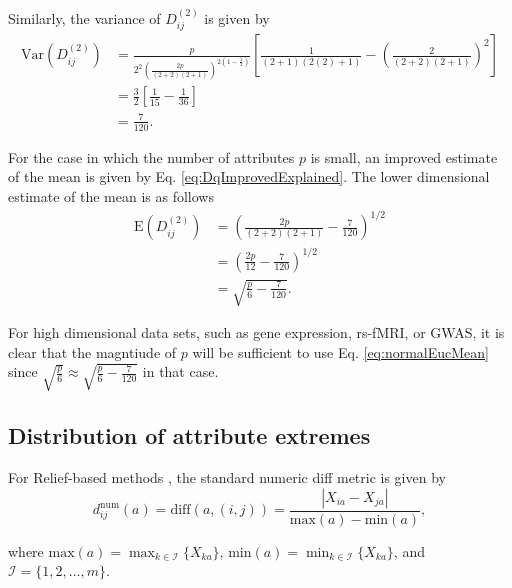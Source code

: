 \documentclass[10pt,letterpaper]{article}\usepackage[]{graphicx}\usepackage[]{color}
\begin{document}
Similarly, the variance of $D^{(2)}_{ij}$ is given by
%
\begin{equation}\label{eq:uniformEucVar}
\begin{aligned}
\text{Var}\left(D^{(2)}_{ij}\right) &= \frac{p}{2^2\left(\frac{2p}{(2 + 2)(2 + 1)}\right)^{2\left(1 - \frac{1}{2}\right)}}\left[\frac{1}{(2 + 1)(2(2) + 1)} - \left(\frac{2}{(2 + 2)(2 + 1)}\right)^2\right] \\
&= \frac{3}{2}\left[\frac{1}{15} - \frac{1}{36}\right] \\
&= \frac{7}{120}.
\end{aligned}
\end{equation}

For the case in which the number of attributes $p$ is small, an improved estimate of the mean is given by Eq. \ref{eq:DqImprovedExplained}. The lower dimensional estimate of the mean is as follows
%
\begin{equation}\label{eq:uniformEucMeanImproved}
\begin{aligned}
\text{E}\left(D^{(2)}_{ij}\right) &= \left(\frac{2p}{(2+2)(2+1)} - \frac{7}{120}\right)^{1/2} \\
&= \left(\frac{2p}{12} - \frac{7}{120}\right)^{1/2} \\
&= \sqrt{\frac{p}{6} - \frac{7}{120}}.
\end{aligned}
\end{equation}

For high dimensional data sets, such as gene expression, rs-fMRI, or GWAS, it is clear that the magntiude of $p$ will be sufficient to use Eq. \ref{eq:normalEucMean} since $\sqrt{\frac{p}{6}} \approx \sqrt{\frac{p}{6} - \frac{7}{120}}$ in that case.

\subsection{Distribution of attribute extremes}

For Relief-based methods \cite{robnik2003,urbanowiczReliefReview2018}, the standard numeric diff metric is given by
%
\begin{equation}\label{eq:normDiff}
d^{\text{num}}_{ij}(a) = \text{diff}(a,(i,j)) = \frac{|X_{ia} - X_{ja}|}{\text{max}(a) - \text{min}(a)},
\end{equation}

\noindent where $\text{max}(a) = \displaystyle \max_{k \in \mathcal{I}}\{X_{ka}\}$, $\text{min}(a) = \displaystyle \min_{k \in \mathcal{I}}\{X_{ka}\}$, and $\mathcal{I} = \{1,2,\dots,m\}$. 
\end{document}
